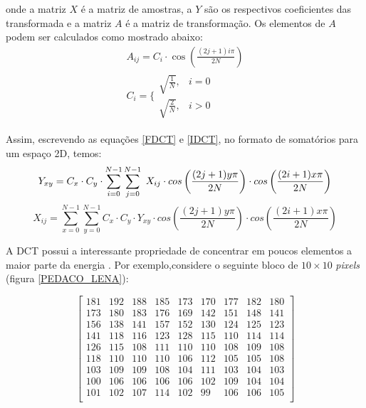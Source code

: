 \noindent onde a matriz $X$ é a matriz de amostras, a $Y$ são os respectivos coeficientes das transformada e a matriz $A$ é a matriz de transformação. Os elementos de $A$ podem ser calculados como mostrado abaixo: \cite{richardson2011h}
\vspace{-3mm}
\begin{equation}
\begin{matrix}
	A_{ij}=C_i\cdot \cos\left ( \frac{(2j+1)i\pi}{2N} \right ) \\
	C_i=\Bigg\{
	\begin{matrix}
		\sqrt{\frac{1}{N}}, & i=0 \\ 
		\sqrt{\frac{2}{N}}, & i>0
	\end{matrix}
\end{matrix}
\end{equation}

Assim, escrevendo as equações \ref{FDCT} e \ref{IDCT}, no formato de somatórios para um espaço 2D, temos:
\vspace{-3mm}
\begin{equation}
	Y_{xy} = C_x \cdot  C_y \cdot  \sum_{i=0}^{N-1} \sum_{j=0}^{N-1} \hspace{1mm} X_{ij} \cdot  cos \left( \frac{(2j+1)y\pi}{2N} \right) \cdot cos \left( \frac{(2i+1)x\pi}{2N} \right)
\end{equation}
\vspace{-3mm}
\begin{equation}
	X_{ij} =   \sum_{x=0}^{N-1} \sum_{y=0}^{N-1} C_x \cdot  C_y \cdot Y_{xy} \cdot  cos \left( \frac{(2j+1)y\pi}{2N} \right) \cdot cos \left( \frac{(2i+1)x\pi}{2N} \right)
\end{equation}

A DCT possui a interessante propriedade de concentrar em poucos elementos a maior parte da energia \cite{khayam2003discrete}. Por exemplo,considere o seguinte bloco de $10 \times 10$ \textit{pixels} (figura \ref{PEDACO_LENA}):

\begin{center}
\begin{equation}
\label{lena}
\begin{bmatrix}
  181&  192&  188&  185&  173&  170&  177&  182&  180\\
  173&  180&  183&  176&  169&  142&  151&  148&  141\\
  156&  138&  141&  157&  152&  130&  124&  125&  123\\
  141&  118&  116&  123&  128&  115&  110&  114&  114\\
  126&  115&  108&  111&  110&  110&  108&  109&  108\\
  118&  110&  110&  110&  106&  112&  105&  105&  108\\
  103&  109&  109&  108&  104&  111&  103&  104&  103\\
  100&  106&  106&  106&  106&  102&  109&  104&  104\\
  101&  102&  107&  114&  102&   99&  106&  106&  105\\
\end{bmatrix}
\end{equation}
\end{center}

